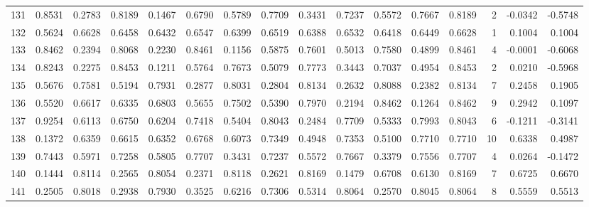 \begin{tabular}{lrrrrrrrrrrrrrrr}
131 &      0.8531 &  0.2783 &  0.8189 &  0.1467 &  0.6790 &  0.5789 &  0.7709 &  0.3431 &  0.7237 &  0.5572 &   0.7667 &     0.8189 &      2 &                   -0.0342 &                    -0.5748 \\
132 &      0.5624 &  0.6628 &  0.6458 &  0.6432 &  0.6547 &  0.6399 &  0.6519 &  0.6388 &  0.6532 &  0.6418 &   0.6449 &     0.6628 &      1 &                    0.1004 &                     0.1004 \\
133 &      0.8462 &  0.2394 &  0.8068 &  0.2230 &  0.8461 &  0.1156 &  0.5875 &  0.7601 &  0.5013 &  0.7580 &   0.4899 &     0.8461 &      4 &                   -0.0001 &                    -0.6068 \\
134 &      0.8243 &  0.2275 &  0.8453 &  0.1211 &  0.5764 &  0.7673 &  0.5079 &  0.7773 &  0.3443 &  0.7037 &   0.4954 &     0.8453 &      2 &                    0.0210 &                    -0.5968 \\
135 &      0.5676 &  0.7581 &  0.5194 &  0.7931 &  0.2877 &  0.8031 &  0.2804 &  0.8134 &  0.2632 &  0.8088 &   0.2382 &     0.8134 &      7 &                    0.2458 &                     0.1905 \\
136 &      0.5520 &  0.6617 &  0.6335 &  0.6803 &  0.5655 &  0.7502 &  0.5390 &  0.7970 &  0.2194 &  0.8462 &   0.1264 &     0.8462 &      9 &                    0.2942 &                     0.1097 \\
137 &      0.9254 &  0.6113 &  0.6750 &  0.6204 &  0.7418 &  0.5404 &  0.8043 &  0.2484 &  0.7709 &  0.5333 &   0.7993 &     0.8043 &      6 &                   -0.1211 &                    -0.3141 \\
138 &      0.1372 &  0.6359 &  0.6615 &  0.6352 &  0.6768 &  0.6073 &  0.7349 &  0.4948 &  0.7353 &  0.5100 &   0.7710 &     0.7710 &     10 &                    0.6338 &                     0.4987 \\
139 &      0.7443 &  0.5971 &  0.7258 &  0.5805 &  0.7707 &  0.3431 &  0.7237 &  0.5572 &  0.7667 &  0.3379 &   0.7556 &     0.7707 &      4 &                    0.0264 &                    -0.1472 \\
140 &      0.1444 &  0.8114 &  0.2565 &  0.8054 &  0.2371 &  0.8118 &  0.2621 &  0.8169 &  0.1479 &  0.6708 &   0.6130 &     0.8169 &      7 &                    0.6725 &                     0.6670 \\
141 &      0.2505 &  0.8018 &  0.2938 &  0.7930 &  0.3525 &  0.6216 &  0.7306 &  0.5314 &  0.8064 &  0.2570 &   0.8045 &     0.8064 &      8 &                    0.5559 &                     0.5513 \\

\end{tabular}
